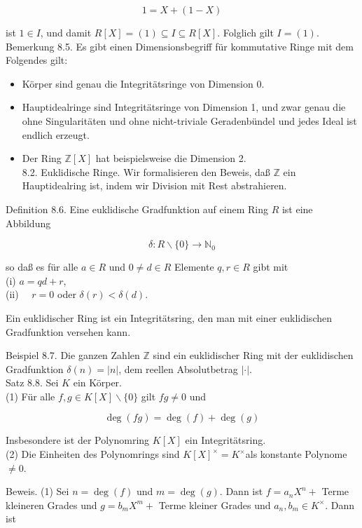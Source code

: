 \documentclass[10pt, letterpaper]{article}
\begin{document}
$$
1=X+(1-X)
$$

ist $1 \in I$, und damit $R[X]=(1) \subseteq I \subseteq R[X]$. Folglich gilt $I=(1)$.\\
Bemerkung 8.5. Es gibt einen Dimensionsbegriff für kommutative Ringe mit dem Folgendes gilt:

\begin{itemize}
  \item Körper sind genau die Integritätsringe von Dimension 0.
  \item Hauptidealringe sind Integritätsringe von Dimension 1, und zwar genau die ohne Singularitäten und ohne nicht-triviale Geradenbündel und jedes Ideal ist endlich erzeugt.
  \item Der Ring $\mathbb{Z}[X]$ hat beispielsweise die Dimension 2.\\
8.2. Euklidische Ringe. Wir formalisieren den Beweis, daß $\mathbb{Z}$ ein Hauptidealring ist, indem wir Division mit Rest abstrahieren.
\end{itemize}

Definition 8.6. Eine euklidische Gradfunktion auf einem Ring $R$ ist eine Abbildung

$$
\delta: R \backslash\{0\} \rightarrow \mathbb{N}_{0}
$$

so daß es für alle $a \in R$ und $0 \neq d \in R$ Elemente $q, r \in R$ gibt mit\\
(i) $a=q d+r$,\\
(ii) $\quad r=0$ oder $\delta(r)<\delta(d)$.

Ein euklidischer Ring ist ein Integritätsring, den man mit einer euklidischen Gradfunktion versehen kann.

Beispiel 8.7. Die ganzen Zahlen $\mathbb{Z}$ sind ein euklidischer Ring mit der euklidischen Gradfunktion $\delta(n)=|n|$, dem reellen Absolutbetrag $|\cdot|$.\\
Satz 8.8. Sei $K$ ein Körper.\\
(1) Für alle $f, g \in K[X] \backslash\{0\}$ gilt $f g \neq 0$ und

$$
\operatorname{deg}(f g)=\operatorname{deg}(f)+\operatorname{deg}(g)
$$

Insbesondere ist der Polynomring $K[X]$ ein Integritätsring.\\
(2) Die Einheiten des Polynomrings sind $K[X]^{\times}=K^{\times}$als konstante Polynome $\neq 0$.

Beweis. (1) Sei $n=\operatorname{deg}(f)$ und $m=\operatorname{deg}(g)$. Dann ist $f=a_{n} X^{n}+$ Terme kleineren Grades und $g=b_{m} X^{m}+$ Terme kleiner Grades und $a_{n}, b_{m} \in K^{\times}$. Dann ist
\end{document}
